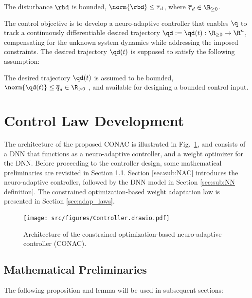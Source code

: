 \documentclass[journal]{IEEEtran}
\begin{document}
\begin{prop}
    The disturbance $\rbd$ is bounded, \ie $\norm{\rbd}\le \overline\tau_d$, where $\overline\tau_d\in\R_{\ge0}$.
    \label{prop:dis_bound}
\end{prop}

The control objective is to develop a neuro-adaptive controller that enables $\q$ to track a continuously differentiable desired trajectory $\qd:=\qd(t): \R_{\ge0} \to \R^n$, compensating for the unknown system dynamics while addressing the imposed constraints.
The desired trajectory $\qd(t)$ is supposed to satisfy the following assumption:
\begin{assum}
    The desired trajectory $\qd(t)$ is assumed to be bounded, \ie $\norm{\qd(t)}\le \overline{q}_d\in\R_{>0}$ , and available for designing a bounded control input.
    \label{assum:feasible}
\end{assum}

\section{Control Law Development}\label{sec:ctrl design}

The architecture of the proposed CONAC is illustrated in Fig.~\ref{fig:ctrl:diagram}, and consists of a DNN that functions as a neuro-adaptive controller, and a weight optimizer for the DNN.
Before proceeding to the controller design, some mathematical preliminaries are revisited in Section \ref{sec:sub:math preliminaries}. 
Section \ref{sec:sub:NAC} introduces the neuro-adaptive controller, followed by the DNN model in Section \ref{sec:sub:NN definition}. 
The constrained optimization-based weight adaptation law is presented in Section \ref{sec:adap_laws}.

\begin{figure}[!t]
    \centering
    \texttt{[image: src/figures/Controller.drawio.pdf]}
    \caption{Architecture of the constrained optimization-based neuro-adaptive controller (CONAC).}
    \label{fig:ctrl:diagram}
\end{figure}

\subsection{Mathematical Preliminaries}\label{sec:sub:math preliminaries}

The following proposition and lemma will be used in subsequent sections:
\end{document}
